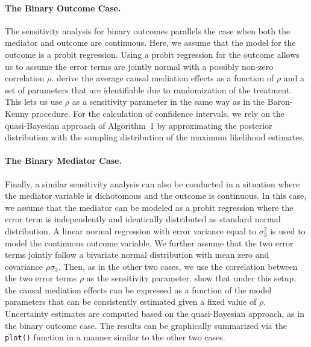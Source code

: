 \documentclass[11pt,letterpaper]{article}
\theoremstyle{plain}
\begin{document}
\paragraph{The Binary Outcome Case.}

The sensitivity analysis for binary outcomes parallels the case when
both the mediator and outcome are continuous.  Here, we assume that
the model for the outcome is a probit regression. Using a probit
regression for the outcome allows us to assume the error terms are
jointly normal with a possibly non-zero correlation $\rho$.
\citet{imai:keel:ting:10} derive the average causal mediation effects
as a function of $\rho$ and a set of parameters that are identifiable
due to randomization of the treatment. This lets us use $\rho$ as a
sensitivity parameter in the same way as in the Baron-Kenny procedure.
For the calculation of confidence intervals, we rely on the
quasi-Bayesian approach of Algorithm~1 by approximating the posterior
distribution with the sampling distribution of the maximum likelihood
estimates.


\paragraph{The Binary Mediator Case.}

Finally, a similar sensitivity analysis can also be conducted in a
situation where the mediator variable is dichotomous and the outcome
is continuous.  In this case, we assume that the mediator can be
modeled as a probit regression where the error term is independently
and identically distributed as standard normal distribution.  A linear
normal regression with error variance equal to $\sigma_3^2$ is used to
model the continuous outcome variable.  We further assume that the two
error terms jointly follow a bivariate normal distribution with mean
zero and covariance $\rho\sigma_3$.  Then, as in the other two cases,
we use the correlation between the two error terms $\rho$ as the
sensitivity parameter.  \citet{imai:keel:ting:10} show that under this
setup, the causal mediation effects can be expressed as a function of
the model parameters that can be consistently estimated given a fixed
value of $\rho$.  Uncertainty estimates are computed based on the
quasi-Bayesian approach, as in the binary outcome case.  The results
can be graphically summarized via the \texttt{plot()} function in a
manner similar to the other two cases.
\end{document}
